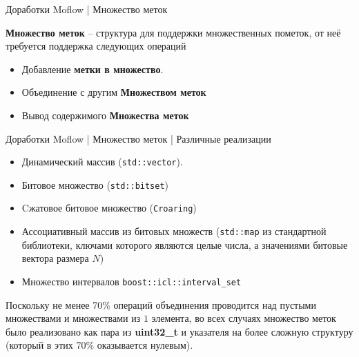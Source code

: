 \documentclass[10pt]{beamer}
\begin{document}
\begin{frame}{Доработки Moflow | Множество меток}
    
    \textbf{Множество меток} -- структура для поддержки множественных пометок, от неё требуется поддержка следующих операций
    \begin{itemize}
        \item Добавление \textbf{метки в множество}.
        \item Объединение с другим \textbf{Множеством меток}
        \item Вывод содержимого \textbf{Множества меток}
     \end{itemize}

\end{frame}

\begin{frame}{Доработки Moflow | Множество меток | Различные реализации }
    \begin{itemize}

        \item Динамический массив (\texttt{std::vector}).
        \item Битовое множество (\texttt{std::bitset})
        \item Cжатовое битовое множество (\texttt{Croaring})
        \item Ассоциативный массив из битовых множеств (\texttt{std::map} из стандартной библиотеки, ключами которого являются целые числа, а значениями битовые вектора размера $N$)
        \item Множество интервалов \texttt{boost::icl::interval\_set}
     \end{itemize}
     \pause
       Поскольку не менее 70\% операций объединения проводится над пустыми множествами и множествами из $1$ элемента, во всех случаях множество меток было реализовано как пара из \textbf{uint32\_t} и указателя на более сложную структуру (который в этих 70\% оказывается нулевым).

\end{frame}
\end{document}
